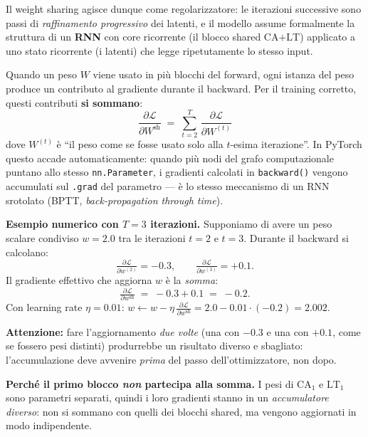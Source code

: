 \documentclass[
  11pt,
]{article}
\begin{document}
Il weight sharing agisce dunque come regolarizzatore: le iterazioni successive sono passi di \emph{raffinamento progressivo} dei latenti, e il modello assume formalmente la struttura di un \textbf{RNN} con core ricorrente (il blocco shared $\text{CA+LT}$) applicato a uno stato ricorrente (i latenti) che legge ripetutamente lo stesso input.

\begin{notabox}[title={\textbf{Come si comporta il weight sharing nel backward pass}}]
Quando un peso $W$ viene usato in più blocchi del forward, ogni istanza del peso produce un contributo al gradiente durante il backward. Per il training corretto, questi contributi \textbf{si sommano}:
\[
\boxed{\;\frac{\partial \mathcal{L}}{\partial W^{\text{sh}}} \;=\; \sum_{t = 2}^{T}\,\frac{\partial \mathcal{L}}{\partial W^{(t)}}\;}
\]
dove $W^{(t)}$ è ``il peso come se fosse usato solo alla $t$-esima iterazione''. In PyTorch questo accade automaticamente: quando più nodi del grafo computazionale puntano allo stesso \texttt{nn.Parameter}, i gradienti calcolati in \texttt{backward()} vengono accumulati sul \texttt{.grad} del parametro --- è lo stesso meccanismo di un RNN srotolato (BPTT, \emph{back-propagation through time}).

\medskip
\textbf{Esempio numerico con $T=3$ iterazioni.} Supponiamo di avere un peso scalare condiviso $w = 2.0$ tra le iterazioni $t=2$ e $t=3$. Durante il backward si calcolano:
\[
\tfrac{\partial\mathcal{L}}{\partial w^{(2)}} = -0.3, \qquad \tfrac{\partial\mathcal{L}}{\partial w^{(3)}} = +0.1.
\]
Il gradiente effettivo che aggiorna $w$ è la \emph{somma}:
\[
\tfrac{\partial\mathcal{L}}{\partial w^{\text{sh}}} \;=\; -0.3 + 0.1 \;=\; -0.2.
\]
Con learning rate $\eta = 0.01$: $w \leftarrow w - \eta\, \tfrac{\partial\mathcal{L}}{\partial w^{\text{sh}}} = 2.0 - 0.01\cdot(-0.2) = 2.002$.

\medskip
\textbf{Attenzione:} fare l'aggiornamento \emph{due volte} (una con $-0.3$ e una con $+0.1$, come se fossero pesi distinti) produrrebbe un risultato diverso e sbagliato: l'accumulazione deve avvenire \emph{prima} del passo dell'ottimizzatore, non dopo.

\medskip
\textbf{Perché il primo blocco \emph{non} partecipa alla somma.} I pesi di $\text{CA}_1$ e $\text{LT}_1$ sono parametri separati, quindi i loro gradienti stanno in un \emph{accumulatore diverso}: non si sommano con quelli dei blocchi shared, ma vengono aggiornati in modo indipendente.
\end{notabox}
\end{document}
